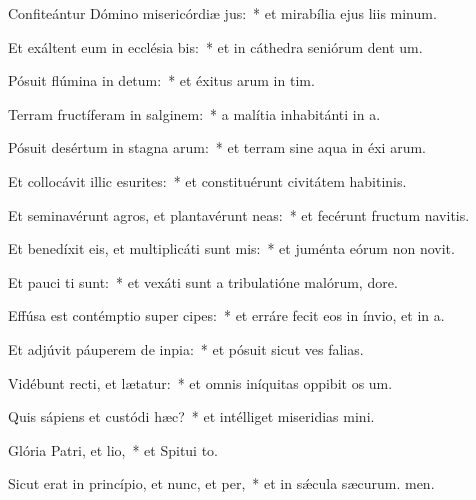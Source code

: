 \item Confiteántur Dómino misericórdiæ jus:~* et mirabília ejus liis minum.
\item Et exáltent eum in ecclésia bis:~* et in cáthedra seniórum dent um.
\item Pósuit flúmina in detum:~* et éxitus arum in tim.
\item Terram fructíferam in salginem:~* a malítia inhabitánti in a.
\item Pósuit desértum in stagna arum:~* et terram sine aqua in éxi arum.
\item Et collocávit illic esurites:~* et constituérunt civitátem habitinis.
\item Et seminavérunt agros, et plantavérunt neas:~* et fecérunt fructum navitis.
\item Et benedíxit eis, et multiplicáti sunt mis:~* et juménta eórum non novit.
\item Et pauci ti sunt:~* et vexáti sunt a tribulatióne malórum,  dore.
\item Effúsa est contémptio super cipes:~* et erráre fecit eos in ínvio, et  in a.
\item Et adjúvit páuperem de inpia:~* et pósuit sicut ves falias.
\item Vidébunt recti, et lætatur:~* et omnis iníquitas oppibit os um.
\item Quis sápiens et custódi hæc?~* et intélliget miseridias mini.
\item Glória Patri, et lio,~* et Spitui to.
\item Sicut erat in princípio, et nunc, et per,~* et in sǽcula sæcurum. men.
